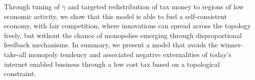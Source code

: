 \documentclass[a4paper,12pt]{article}
\begin{document}
Through tuning of $\gamma$ and targeted redistribution of tax money to regions of low economic activity, we show that this model is able to fuel a self-consistent economy, 
with fair competition, where innovations can spread across the topology freely, but without the chance of monopolies emerging through disproportional feedback mechanisms. 
In summary, we present a model that avoids the winner-take-all monopoly tendency and associated negative externalities of today's internet enabled business through a low cost tax based on a topological constraint. 
\end{document}
